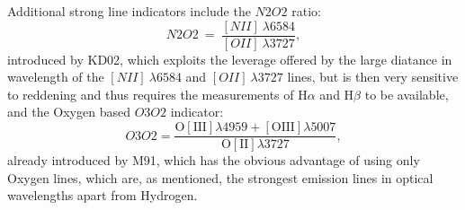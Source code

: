 \documentclass{emulateapj} \usepackage{amsmath} \usepackage{float}
\newcommand{\oxabinline}{\ensuremath{12 + \log_{10}(O/H)}}
\newcommand{\ha}{\ensuremath{\mathrm{H}\alpha}}
\newcommand{\hb}{\ensuremath{\mathrm{H}\beta}}
\begin{document}
Additional strong line indicators include the $N2O2$ ratio:
$$N2O2 ~=~ \frac{[NII]~\lambda 6584}{[OII]~\lambda 3727},$$ introduced
by KD02, which exploits the leverage offered by the large
diatance in wavelength of the $[NII]~\lambda 6584$ and $[OII]~\lambda3727$ lines, but is then very sensitive to reddening and thus requires the
measurements of $\ha$ and $\hb$ to be available, and the Oxygen based
$O3O2$ indicator:
$$O3O2=\frac{\mathrm{O[III]}\lambda4959+\mathrm{[OIII]}\lambda5007}{\mathrm{O[II]}\lambda3727},$$
already introduced by M91, which has the
obvious advantage of using only Oxygen lines, which are, as mentioned,
the strongest emission lines in optical wavelengths apart from
Hydrogen.
 
\end{document}
